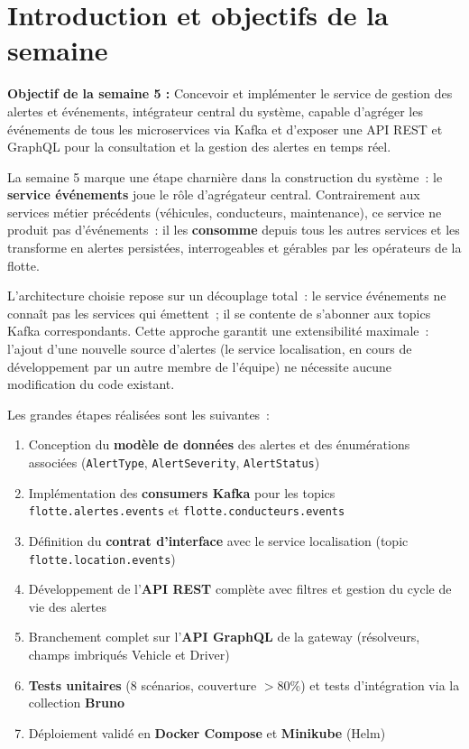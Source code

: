 \documentclass[12pt,a4paper]{article}
\begin{document}
\section{Introduction et objectifs de la semaine}

\begin{infobox}
\textbf{Objectif de la semaine 5 :} Concevoir et implémenter le service de gestion
des alertes et événements, intégrateur central du système, capable d'agréger les
événements de tous les microservices via Kafka et d'exposer une API REST et GraphQL
pour la consultation et la gestion des alertes en temps réel.
\end{infobox}

\vspace{0.5cm}

La semaine 5 marque une étape charnière dans la construction du système~: le
\textbf{service événements} joue le rôle d'agrégateur central. Contrairement aux
services métier précédents (véhicules, conducteurs, maintenance), ce service ne
produit pas d'événements~: il les \textbf{consomme} depuis tous les autres services
et les transforme en alertes persistées, interrogeables et gérables par les
opérateurs de la flotte.

L'architecture choisie repose sur un découplage total~: le service événements ne
connaît pas les services qui émettent~; il se contente de s'abonner aux topics Kafka
correspondants. Cette approche garantit une extensibilité maximale~: l'ajout d'une
nouvelle source d'alertes (le service localisation, en cours de développement par un
autre membre de l'équipe) ne nécessite aucune modification du code existant.

Les grandes étapes réalisées sont les suivantes~:

\begin{enumerate}[leftmargin=*, label=\textbf{\arabic*.}]
  \item Conception du \textbf{modèle de données} des alertes et des énumérations
        associées (\texttt{AlertType}, \texttt{AlertSeverity}, \texttt{AlertStatus})
  \item Implémentation des \textbf{consumers Kafka} pour les topics
        \texttt{flotte.alertes.events} et \texttt{flotte.conducteurs.events}
  \item Définition du \textbf{contrat d'interface} avec le service localisation
        (topic \texttt{flotte.location.events})
  \item Développement de l'\textbf{API REST} complète avec filtres et gestion du
        cycle de vie des alertes
  \item Branchement complet sur l'\textbf{API GraphQL} de la gateway (résolveurs,
        champs imbriqués Vehicle et Driver)
  \item \textbf{Tests unitaires} (8 scénarios, couverture $>$80\%) et tests
        d'intégration via la collection \textbf{Bruno}
  \item Déploiement validé en \textbf{Docker Compose} et \textbf{Minikube} (Helm)
\end{enumerate}
\end{document}
